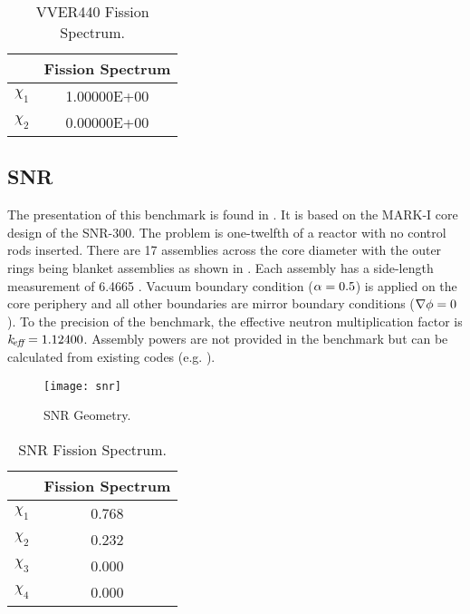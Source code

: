     \begin{table}
      \caption{VVER440 Fission Spectrum.}
      \label{tab:vver440chi}
      \begin{center}
        \begin{tabular}{cc}
          \toprule
          &Fission Spectrum \\
          \midrule
          $\chi_1$ & 1.00000E+00  \\
          $\chi_2$ & 0.00000E+00  \\
          \bottomrule
        \end{tabular}
      \end{center}
    \end{table}
  \subsection{SNR}
    \label{sec:snr}
    The presentation of this benchmark is found in \cite{argonneBenchmark}. It
    is based on the MARK-I core design of the SNR-300. The problem is
    one-twelfth of a reactor with no control rods inserted. There are 17
    assemblies across the core diameter with the outer rings being blanket
    assemblies as shown in . Each assembly has a side-length
    measurement of 6.4665 . Vacuum boundary condition ($\alpha =
    0.5$) is applied on the core periphery and all other boundaries are mirror
    boundary conditions ($\mathbf{\nabla} \phi = 0$). To the precision of the benchmark,
    the effective neutron multiplication factor is $k_{\!\mbox{\scriptsize \em eff}} = 1.12400$. Assembly
    powers are not provided in the benchmark but can be calculated from existing
    codes (e.g. \dif).
    \begin{figure}
      \centering
      \texttt{[image: snr]}
      \caption{SNR Geometry.}
      \label{fig:snr_geom}
    \end{figure}
    \begin{table}
      \caption{SNR Fission Spectrum.}
      \label{tab:snrchi}
      \begin{center}
        \begin{tabular}{cc}
          \toprule
          &Fission Spectrum \\
          \midrule
          $\chi_1$ &0.768 \\
          $\chi_2$ &0.232 \\
          $\chi_3$ &0.000 \\
          $\chi_4$ &0.000 \\
          \bottomrule
        \end{tabular}
      \end{center}
    \end{table}
